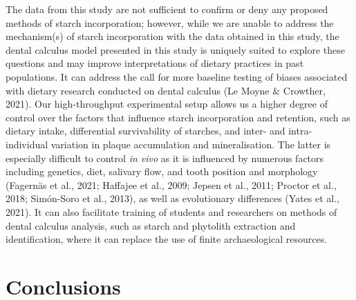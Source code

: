 \documentclass[
]{article}
\begin{document}
The data from this study are not sufficient to confirm or deny any proposed
methods of starch incorporation; however, while we are unable to address the
mechanism(s) of starch incorporation with the data obtained in this study,
the dental calculus model presented in this study is uniquely suited to explore
these questions and may improve interpretations of dietary practices in past populations.
It can address the call for more baseline testing of biases associated with
dietary research conducted on dental calculus
(Le Moyne \& Crowther, 2021).
Our high-throughput experimental setup allows us a
higher degree of control over the factors that influence starch incorporation and
retention, such as dietary intake, differential survivability of starches,
and inter- and intra-individual variation in plaque accumulation and mineralisation.
The latter is especially difficult to control \emph{in vivo} as it is influenced by
numerous factors including genetics, diet, salivary flow, and tooth position and
morphology
(Fagernäs et al., 2021; Haffajee et al., 2009; Jepsen et al., 2011; Proctor et al., 2018; Simón-Soro et al., 2013),
as well as evolutionary differences (Yates et al., 2021).
It can also facilitate training of students and researchers on methods of
dental calculus analysis, such as starch and phytolith extraction and
identification, where it can replace the use of finite archaeological resources.

\hypertarget{conclusions}{%
\section{Conclusions}\label{conclusions}}
\end{document}
